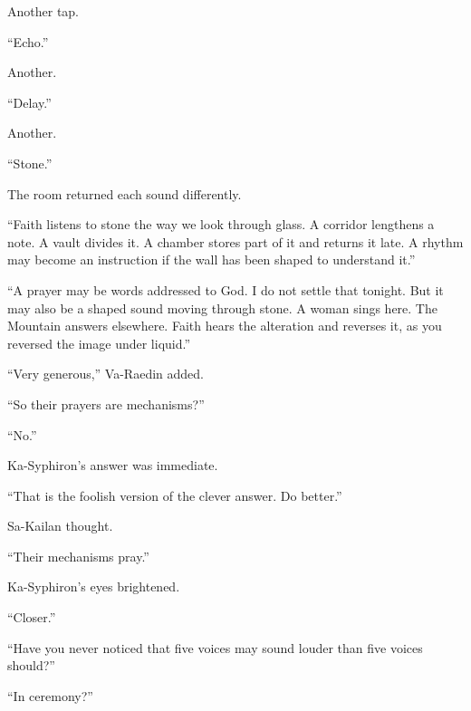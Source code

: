 Another tap.\par

“Echo.”\par

Another.\par

“Delay.”\par

Another.\par

“Stone.”\par

The room returned each sound differently.\par

“Faith listens to stone the way we look through glass.
A corridor lengthens a note.
A vault divides it.
A chamber stores part of it and returns it late.
A rhythm may become an instruction if the wall has been shaped to understand it.”\par

“A prayer may be words addressed to God.
I do not settle that tonight.
But it may also be a shaped sound moving through stone.
A woman sings here.
The Mountain answers elsewhere.
Faith hears the alteration and reverses it, as you reversed the image under liquid.”\par

“Very generous,” Va-Raedin added.\par

“So their prayers are mechanisms?”\par

“No.”\par

Ka-Syphiron’s answer was immediate.\par

“That is the foolish version of the clever answer.
Do better.”\par

Sa-Kailan thought.\par

“Their mechanisms pray.”\par

Ka-Syphiron’s eyes brightened.\par

“Closer.”\par

“Have you never noticed that five voices may sound louder than five voices should?”\par

“In ceremony?”\par

